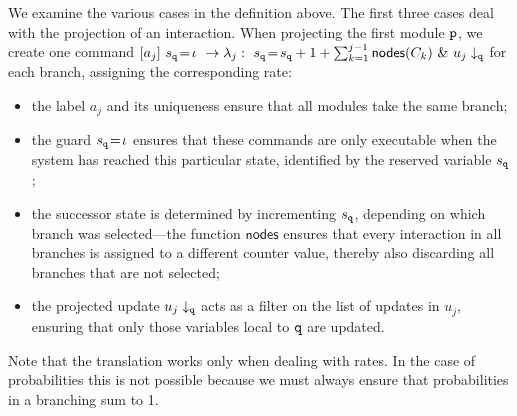     We examine the various cases in the definition above. The first
    three cases deal with the projection of an interaction. When
    projecting the first module \( \mathtt{p} \), we create one command
    $[a_j]\ s_{\mathtt{q}}\!=\! \iota\ \rightarrow \lambda_j:\ s_{\mathtt{q}}\!=\!  s_{\mathtt{q}}
      +1+\sum_{k=1}^{j-1}\mathsf{nodes}({C_k})\ \&\ u_j\downarrow_{\mathtt{q}}$ for each branch, assigning the corresponding rate:
    \begin{itemize}
    \item the label $a_j$ and its uniqueness ensure that all modules
      take the same branch;
    \item the guard $s_{\mathtt{q}}\!=\! \iota$ ensures that these
      commands are only executable when the system has reached this
      particular state, identified by the reserved variable
      $s_{\mathtt{q}}$;
    \item the successor state is determined by incrementing
      $s_{\mathtt{q}}$, depending on which branch was selected—the
      function $\mathsf{nodes}$ ensures that every interaction in all
      branches is assigned to a different counter value, thereby also
      discarding all branches that are not selected;
    \item the projected update $u_j\downarrow_{\mathtt{q}}$ acts as a
      filter on the list of updates in $u_j$, ensuring that only those
      variables local to $\mathtt{q}$ are updated.
    \end{itemize}
    Note that the translation works only when dealing with rates. In
    the case of probabilities this is not possible because we must
    always ensure that probabilities in a branching sum to 1.

